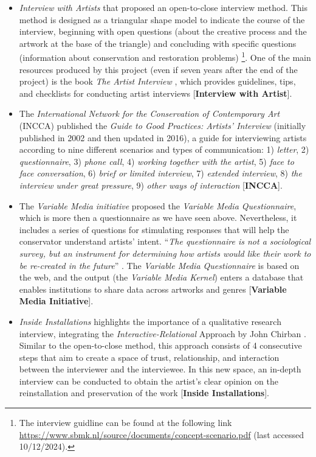 \begin{itemize}
    \item \textit{Interview with Artists} that proposed an open-to-close interview method. This method is designed as a triangular shape model to indicate the course of the interview,  beginning with open questions (about the creative process and the artwork at the base of the triangle) and concluding with specific questions (information about conservation and restoration problems) \footnote{The interview guidline can be found at the following link \url{https://www.sbmk.nl/source/documents/concept-scenario.pdf} (last accessed 10/12/2024).}. One of the main resources produced by this project (even if seven years after the end of the project) is the book \textit{The Artist Interview} \cite{beerkens2012artist}, which provides guidelines, tips, and checklists for conducting artist interviews [\textbf{Interview with Artist}].
    \item The \textit{International Network for the Conservation of Contemporary Art} (INCCA) published the \textit{Guide to Good Practices: Artists’ Interview} (initially published in 2002 and then updated in 2016), a guide for interviewing artists according to nine different scenarios and types of communication: 1) \textit{letter}, 2) \textit{questionnaire}, 3) \textit{phone call}, 4) \textit{working together with the artist}, 5) \textit{face to face conversation}, 6) \textit{brief or limited interview}, 7) \textit{extended interview}, 8) \textit{the interview under great pressure}, 9) \textit{other ways of interaction} \cite{incca2016artistinterview}[\textbf{INCCA}].
    \item The \textit{Variable Media initiative} proposed the \textit{Variable Media Questionnaire}, which is more then a questionnaire as we have seen above. Nevertheless, it includes a series of questions for stimulating responses that will help the conservator understand artists’ intent. ``\textit{The questionnaire is not a sociological survey, but an instrument for determining how artists would like their work to be re-created in the future}'' \cite{ippolito2005accommodating}. The \textit{Variable Media Questionnaire} is based on the web, and the output (the \textit{Variable Media Kernel}) enters a database that enables institutions to share data across artworks and genres [\textbf{Variable Media Initiative}].\\
    \item \textit{Inside Installations} highlights the importance of a qualitative research interview, integrating the \textit{Interactive-Relational} Approach by John Chirban \cite{chirban1996interviewing}. Similar to the open-to-close method, this approach consists of 4 consecutive steps that aim to create a space of trust, relationship, and interaction between the interviewer and the interviewee. In this new space, an in-depth interview can be conducted to obtain the artist's clear opinion on the reinstallation and preservation of the work [\textbf{Inside Installations}].

\end{itemize}

